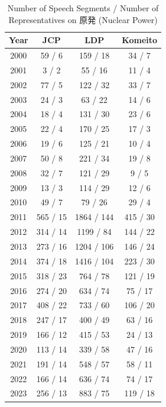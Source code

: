 \documentclass[final,5p,times,twocolumn,authoryear]{elsarticle}
\begin{document}
\begin{table}[h]
\begin{CJK}{UTF8}{min}
    \centering
    \begin{tabular}{c|ccc}
        \hline
        Year & JCP & LDP & Komeito \\
        \hline
        2000 & 59 / 6 & 159 / 18 & 34 / 7 \\
        2001 & 3 / 2 & 55 / 16 & 11 / 4 \\
        2002 & 77 / 5 & 122 / 32 & 33 / 7 \\
        2003 & 24 / 3 & 63 / 22 & 14 / 6 \\
        2004 & 18 / 4 & 131 / 30 & 23 / 6 \\
        2005 & 22 / 4 & 170 / 25 & 17 / 3 \\
        2006 & 19 / 6 & 125 / 21 & 10 / 4 \\
        2007 & 50 / 8 & 221 / 34 & 19 / 8 \\
        2008 & 32 / 7 & 121 / 29 & 9 / 5 \\
        2009 & 13 / 3 & 114 / 29 & 12 / 6 \\
        2010 & 49 / 7 & 79 / 26 & 29 / 4 \\
        2011 & 565 / 15 & 1864 / 144 & 415 / 30 \\
        2012 & 314 / 14 & 1199 / 84 & 144 / 22 \\
        2013 & 273 / 16 & 1204 / 106 & 146 / 24 \\
        2014 & 374 / 18 & 1416 / 104 & 223 / 30 \\
        2015 & 318 / 23 & 764 / 78 & 121 / 19 \\
        2016 & 274 / 20 & 634 / 74 & 75 / 17 \\
        2017 & 408 / 22 & 733 / 60 & 106 / 20 \\
        2018 & 247 / 17 & 400 / 49 & 63 / 16 \\
        2019 & 166 / 12 & 415 / 53 & 24 / 13 \\
        2020 & 113 / 14 & 339 / 58 & 47 / 16 \\
        2021 & 191 / 14 & 548 / 57 & 58 / 11 \\
        2022 & 166 / 14 & 636 / 74 & 74 / 17 \\
        2023 & 256 / 13 & 883 / 75 & 119 / 18 \\
        \hline
    \end{tabular}
    \caption{Number of Speech Segments / Number of Representatives on 原発 (Nuclear Power)}
    \label{tab:nuclear_speech}
	\end{CJK}
\end{table}
\end{document}
